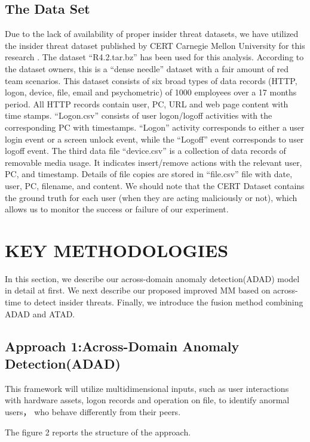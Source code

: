 \documentclass[conference]{IEEEtran}
\begin{document}
\subsection{The Data Set}

Due to the lack of availability of proper insider threat datasets, we have utilized the insider threat
dataset published by CERT Carnegie Mellon University for this research \cite{b39}. The dataset “R4.2.tar.bz” has been used for this analysis. According to the dataset owners, this is a “dense needle” dataset with a fair amount of red team scenarios. This dataset consists of six broad types of data records (HTTP, logon, device, file, email and psychometric) of 1000 employees over a 17 months period. 
All HTTP records contain user, PC, URL and web page content with time stamps. “Logon.csv” consists of user logon/logoff activities with the corresponding PC with timestamps. “Logon” activity corresponds to either a user login event or a screen unlock event, while the “Logoff” event corresponds to user logoff event.  The third data file “device.csv” is a collection of data records of removable media usage. It indicates insert/remove actions with the relevant user, PC, and timestamp. Details of file copies are stored in “file.csv” file with date, user, PC, filename, and content.
We should note that the CERT Dataset contains the ground truth for each user (when they are acting maliciously or not), which allows us to monitor the success or failure of our experiment.

\section{KEY METHODOLOGIES}
In this section, we describe our across-domain anomaly detection(ADAD) model in detail at first. We next describe our proposed improved MM based on across-time to detect insider threats. Finally, we introduce the fusion method combining ADAD and ATAD.


\subsection{Approach 1:Across-Domain Anomaly Detection(ADAD)}\label{AA}

This framework will utilize multidimensional inputs, such as user interactions with hardware
assets, logon records and operation on file, to identify anormal users， who behave differently from their peers.

The figure 2 reports the structure of the approach.
\end{document}
